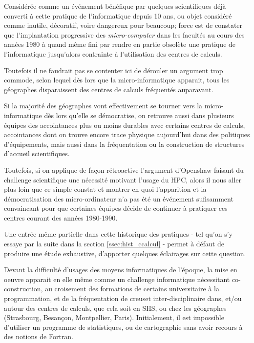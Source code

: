 Considérée comme un événement bénéfique par quelques scientifiques déjà converti à cette pratique de l'informatique depuis 10 ans, ou objet considéré comme inutile, décoratif, voire dangereux pour beaucoup; force est de constater que l'implantation progressive des \textit{micro-computer} dans les facultés au cours des années 1980 à quand même fini par rendre en partie obsolète une pratique de l’informatique jusqu'alors contrainte à l'utilisation des centres de calculs.

Toutefois il ne faudrait pas se contenter ici de dérouler un argument trop commode, selon lequel dès lors que la micro-informatique apparait, tous les géographes disparaissent des centres de calculs fréquentés auparavant.

Si la majorité des géographes vont effectivement se tourner vers la micro-informatique dès lors qu'elle se démocratise, on retrouve aussi dans plusieurs équipes des accointances plus ou moins durables avec certains centres de calculs, accointances dont on trouve encore trace physique aujourd'hui dans des politiques d'équipements, mais aussi dans la fréquentation ou la construction de structures d'accueil scientifiques.

Toutefois, si on applique de façon rétroactive l'argument d'Openshaw faisant du challenge scientifique une nécessité motivant l'usage du HPC, alors il nous aller plus loin que ce simple constat et montrer en quoi l'apparition et la démocratisation des micro-ordinateur n'a pas été un événement sufisamment convaincant pour que certaines équipes décide de continuer à pratiquer ces centres courant des années 1980-1990.

Une entrée même partielle dans cette historique des pratiques - tel qu'on s'y essaye par la suite dans la section \ref{ssec:hist_ccalcul} - permet à défaut de produire une étude exhaustive, d'apporter quelques éclairages sur cette question.

Devant la difficulté d'usages des moyens informatiques de l'époque, la mise en oeuvre apparait en elle même comme un challenge informatique nécessitant  co-construction, au croisement des formations de certains universitaire à la programmation, et de la fréquentation de creuset inter-disciplinaire dans, et/ou autour des centres de calculs, que cela soit en SHS, ou chez les géographes (Strasbourg, Besançon, Montpellier, Paris). Initialement, il est impossible d'utiliser un programme de statistiques, ou de cartographie sans avoir recours à des notions de Fortran.

